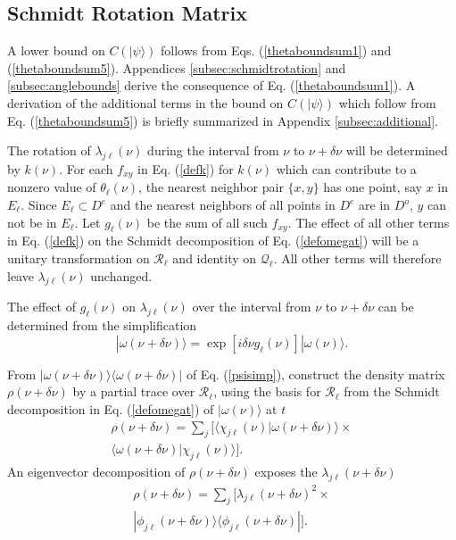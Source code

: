 \documentclass[twocolumn,amsmath,amssymb]{revtex4-1}
\begin{document}
\subsection{\label{subsec:schmidtrotation} Schmidt Rotation Matrix}

A lower bound on $C(|\psi \rangle )$  follows from Eqs. (\ref{thetaboundsum1}) and (\ref{thetaboundsum5}). 
Appendices \ref{subsec:schmidtrotation}
and \ref{subsec:anglebounds} derive the consequence of Eq. (\ref{thetaboundsum1}).
A derivation of the additional terms in the bound on $C(|\psi \rangle )$
which follow
from Eq. (\ref{thetaboundsum5}) is briefly summarized in Appendix \ref{subsec:additional}.

The rotation of $\lambda_{j\ell} (\nu)$ during the interval from $\nu$ to $\nu + \delta \nu$
will be determined by $k(\nu)$. For each $f_{xy}$ in Eq. (\ref{defk}) for $k(\nu)$ which can contribute to 
a nonzero value of $\theta_{\ell}(\nu)$, the nearest neighbor pair $\{x, y\}$ has one point, say $x$ in $E_{\ell}$.
Since $E_{\ell} \subset D^e$ and the nearest neighbors of all points in $D^e$ are in
$D^o$, $y$ can not be in $E_\ell$. Let $g_{\ell}(\nu)$ be the sum of all such $f_{xy}$.
The effect of all other terms in Eq. (\ref{defk}) on the
Schmidt decomposition of Eq. (\ref{defomegat}) will be
a unitary transformation on $\mathcal{R}_\ell$ and identity on $\mathcal{Q}_\ell$.
All other terms will therefore leave $\lambda_{j\ell}( \nu)$ unchanged.

The effect of $g_{\ell}(\nu)$ on $\lambda_{j\ell}(\nu)$ over the
interval from $\nu$ to $\nu + \delta \nu$ can be determined from the simplification
\begin{equation}
\label{psisimp}
|\omega(\nu + \delta \nu) \rangle  = \exp[ i \delta \nu g_{\ell}(\nu)] |\omega(\nu) \rangle .
\end{equation}

From $|\omega(\nu + \delta \nu) \rangle  \langle \omega(\nu + \delta \nu)|$ of Eq. (\ref{psisimp}),
construct the density matrix $\rho(\nu + \delta \nu)$ by 
a partial trace over $\mathcal{R}_{\ell}$, 
using the basis for $\mathcal{R}_{\ell}$
from the Schmidt decomposition in Eq. (\ref{defomegat}) of $|\omega(\nu) \rangle $ at $t$
\begin{multline}
\label{defrho}
\rho(\nu + \delta \nu) = 
\sum_j [ \langle  \chi_{j\ell}(\nu)|\omega(\nu + \delta \nu) \rangle  \times \\ \langle \omega(\nu + \delta \nu)|\chi_{j\ell}(\nu) \rangle ].
\end{multline} 
An eigenvector decomposition of $\rho(\nu + \delta \nu)$ exposes
the $\lambda_{j\ell}(\nu + \delta \nu)$
\begin{multline}
\label{rhodeltat}
\rho(\nu + \delta \nu) = 
\sum_j [\lambda_{j\ell}( \nu + \delta \nu)^2 \times \\
 |\phi_{j\ell}(\nu + \delta \nu) \rangle  \langle \phi_{j\ell}( \nu + \delta \nu)|].
\end{multline}
\end{document}
